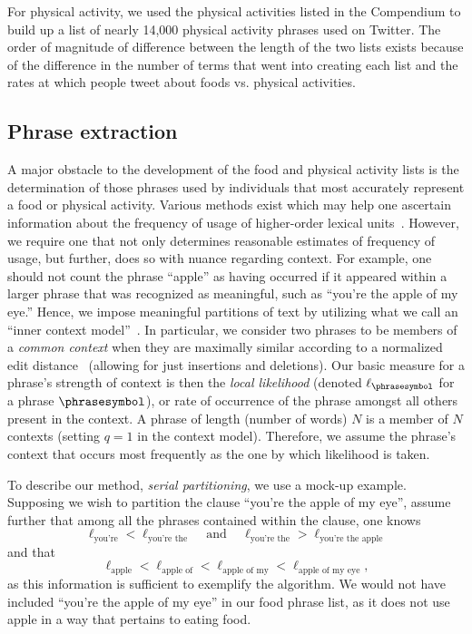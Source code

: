 For physical activity, we used the physical activities listed in the
Compendium to build up a list of nearly 14,000 physical activity
phrases used on Twitter.
The order of magnitude of difference between the length of the two
lists exists because of the difference in the number of terms that
went into creating each list and the rates at which people tweet about
foods vs. physical activities.

\subsection*{Phrase extraction}
\label{subsec:fluxwell.methods-phrase-extraction}

A major obstacle to the development of the food and physical activity
lists is the determination of those phrases used by individuals that
most accurately represent a food or physical activity.  Various
methods exist which may help one ascertain information about the
frequency of usage of higher-order lexical units~\cite{williams2014a}.
However, we require one that not only determines reasonable estimates
of frequency of usage, but further, does so with nuance regarding
context.  For example, one should not count the phrase ``apple'' as
having occurred if it appeared within a larger phrase that was
recognized as meaningful, such as ``you're the apple of my eye.''
Hence, we impose meaningful partitions of text by utilizing what
we call an ``inner context model''~\cite{williams2015c}.
In particular, we consider two phrases to be members
of a \textit{common context} when they are maximally similar according
to a normalized edit distance~\cite{levenshtein1966bcc} (allowing for
just insertions and deletions). Our basic measure for a phrase's
strength of context is then the \textit{local likelihood} (denoted
$\ell_{\phrasesymbol}$ for a phrase $\phrasesymbol$), or rate of occurrence of the phrase
amongst all others present in the context.  
A phrase of length (number of words) $N$ is a member of $N$ contexts (setting $q=1$ in the context model).
Therefore, we assume the
phrase's context that occurs most frequently as the one by which
likelihood is taken.

To describe our method, \textit{serial partitioning}, we use a mock-up
example.  Supposing we wish to partition the clause ``you're the apple
of my eye'', assume further that among all the phrases contained
within the clause, one knows
$$\ell_{\text{you're}} < \ell_{\text{you're the}} \hspace{10pt} \text{ and } \hspace{10pt} \ell_{\text{you're the}} > \ell_{\text{you're the apple}}$$ 
and that
$$\ell_{\text{apple}} < \ell_{\text{apple of}} < \ell_{\text{apple of my}} < \ell_{\text{apple of my eye}},$$ 
as this information is sufficient to exemplify the algorithm.  We
would not have included ``you're the apple of my eye'' in our food
phrase list, as it does not use apple in a way that pertains to eating
food.

